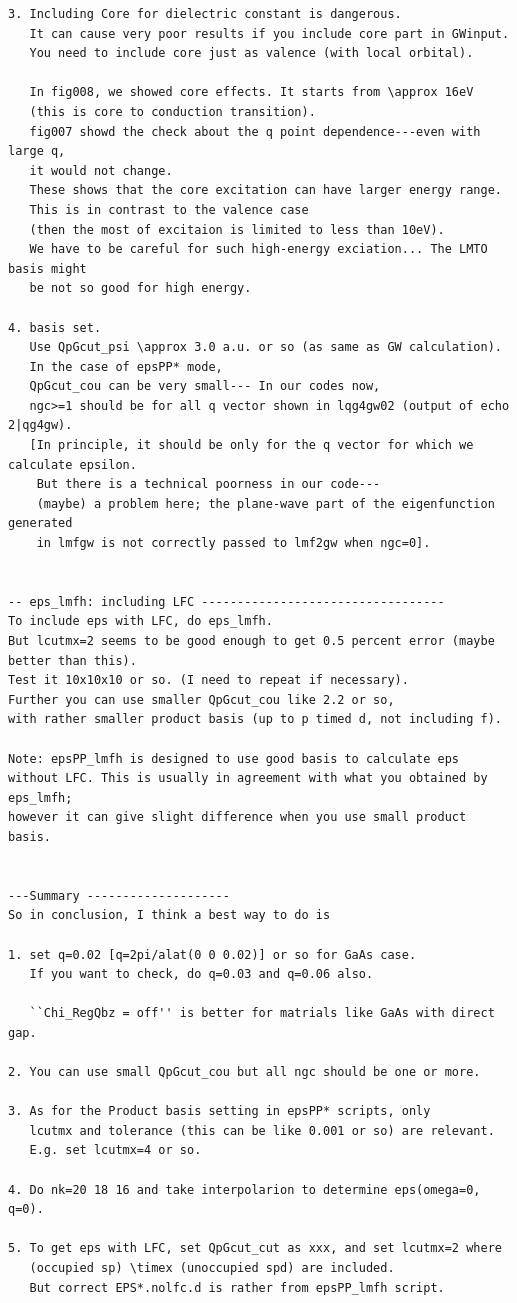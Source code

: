 \documentclass[a4paper,10pt,epsf,fleqn]{article}
\begin{document}
\begin{verbatim}
3. Including Core for dielectric constant is dangerous. 
   It can cause very poor results if you include core part in GWinput.
   You need to include core just as valence (with local orbital).

   In fig008, we showed core effects. It starts from \approx 16eV 
   (this is core to conduction transition).
   fig007 showd the check about the q point dependence---even with large q,
   it would not change.
   These shows that the core excitation can have larger energy range.
   This is in contrast to the valence case 
   (then the most of excitaion is limited to less than 10eV).
   We have to be careful for such high-energy exciation... The LMTO basis might
   be not so good for high energy.

4. basis set.
   Use QpGcut_psi \approx 3.0 a.u. or so (as same as GW calculation).
   In the case of epsPP* mode, 
   QpGcut_cou can be very small--- In our codes now, 
   ngc>=1 should be for all q vector shown in lqg4gw02 (output of echo 2|qg4gw).
   [In principle, it should be only for the q vector for which we calculate epsilon.
    But there is a technical poorness in our code---
    (maybe) a problem here; the plane-wave part of the eigenfunction generated 
    in lmfgw is not correctly passed to lmf2gw when ngc=0].


-- eps_lmfh: including LFC ----------------------------------
To include eps with LFC, do eps_lmfh. 
But lcutmx=2 seems to be good enough to get 0.5 percent error (maybe better than this).
Test it 10x10x10 or so. (I need to repeat if necessary).
Further you can use smaller QpGcut_cou like 2.2 or so, 
with rather smaller product basis (up to p timed d, not including f).

Note: epsPP_lmfh is designed to use good basis to calculate eps 
without LFC. This is usually in agreement with what you obtained by eps_lmfh;
however it can give slight difference when you use small product basis.


---Summary --------------------
So in conclusion, I think a best way to do is

1. set q=0.02 [q=2pi/alat(0 0 0.02)] or so for GaAs case.
   If you want to check, do q=0.03 and q=0.06 also.

   ``Chi_RegQbz = off'' is better for matrials like GaAs with direct gap.

2. You can use small QpGcut_cou but all ngc should be one or more.

3. As for the Product basis setting in epsPP* scripts, only
   lcutmx and tolerance (this can be like 0.001 or so) are relevant.
   E.g. set lcutmx=4 or so.

4. Do nk=20 18 16 and take interpolarion to determine eps(omega=0, q=0).

5. To get eps with LFC, set QpGcut_cut as xxx, and set lcutmx=2 where
   (occupied sp) \timex (unoccupied spd) are included.
   But correct EPS*.nolfc.d is rather from epsPP_lmfh script.

\end{verbatim}
\end{document}
